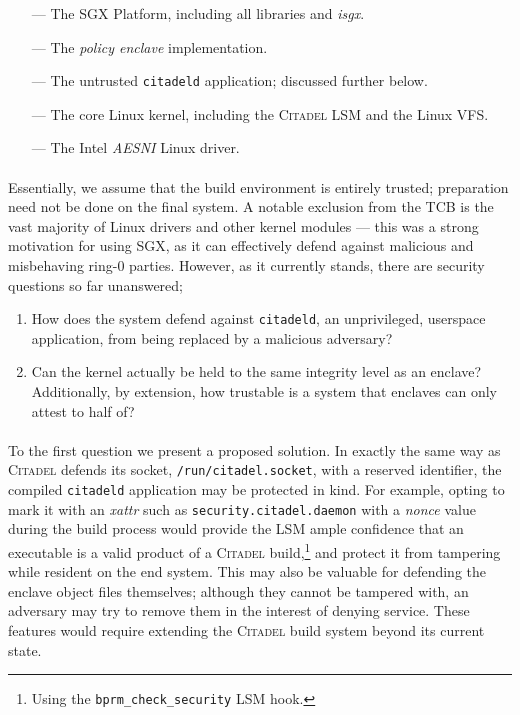 \begin{itemize}
    \item[---] The SGX Platform, including all libraries and \textit{isgx}. 
    \item[---] The \textit{policy enclave} implementation.
    \item[---] The untrusted \texttt{citadeld} application; discussed further below.
    \item[---] The core Linux kernel, including the \textsc{Citadel} LSM and the Linux VFS.   
    \item[---] The Intel \textit{AESNI} Linux driver. 
\end{itemize}

\paragraph{} Essentially, we assume that the build environment is entirely trusted; preparation need not be done on the final system. A notable exclusion from the TCB is the vast majority of Linux drivers and other kernel modules --- this was a strong motivation for using SGX, as it can effectively defend against malicious and misbehaving ring-0 parties. However, as it currently stands, there are security questions so far unanswered;

\begin{enumerate}
    \item How does the system defend against \texttt{citadeld}, an unprivileged, userspace application, from being replaced by a malicious adversary?
    \item Can the kernel actually be held to the same integrity level as an enclave? Additionally, by extension, how trustable is a system that enclaves can only attest to half of?
\end{enumerate}

\paragraph{} To the first question we present a proposed solution. In exactly the same way as \textsc{Citadel} defends its socket, \texttt{/run/citadel.socket}, with a reserved identifier, the compiled \texttt{citadeld} application may be protected in kind. For example, opting to mark it with an \textit{xattr} such as \texttt{security.citadel.daemon} with a \textit{nonce} value during the build process would provide the LSM ample confidence that an executable is a valid product of a \textsc{Citadel} build,\footnote{Using the \texttt{bprm\_check\_security} LSM hook.} and protect it from tampering while resident on the end system. This may also be valuable for defending the enclave object files themselves; although they cannot be tampered with, an adversary may try to remove them in the interest of denying service. These features would require extending the \textsc{Citadel} build system beyond its current state.

